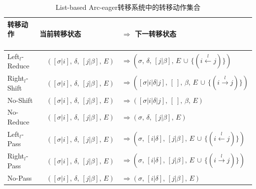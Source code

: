 \begin{table}[htbp]
	\centering
	\small
	\renewcommand{\arraystretch}{1.2}
	\begin{tabular}{l|ll}
		\hline
		\bf 转移动作 \ \ \ \ & \bf 当前转移状态 & $\Rightarrow$ \bf 下一转移状态 \\
		\hline\hline
		Left$_l$-Reduce &\ \ $([\sigma|i],\,\delta,\,[j|\beta],\,E)$ & $\Rightarrow (\sigma,\,\delta,\,[j|\beta],\,E\,\cup\,\{(i\xleftarrow{l}j)\})$ \\
		Right$_l$-Shift &\ \ $([\sigma|i],\,\delta,\,[j|\beta],\,E)$ & $\Rightarrow ([\sigma|i|\delta|j],\,[\ ],\,\beta,\,E\,\cup\,\{(i\xrightarrow{l}j)\})$ \\
		No-Shift &\ \ $([\sigma|i],\,\delta,\,[j|\beta],\,E)$ & $\Rightarrow 
		([\sigma|i|\delta|j],\,[\ ],\,\beta,\,E)$ \\
		No-Reduce &\ \ $([\sigma|i],\,\delta,\,[j|\beta],\,E)$ & $\Rightarrow (\sigma,\,\delta,\,[j|\beta],\,E)$\\
		\hline
		Left$_l$-Pass &\ \ $([\sigma|i],\,\delta,\,[j|\beta],\,E)$ & $\Rightarrow (\sigma,\,[i|\delta],\,[j|\beta],\,E\,\cup\,\{(i\xleftarrow{l}j)\})$\\
		Right$_l$-Pass &\ \ $([\sigma|i],\,\delta,\,[j|\beta],\,E)$ & $\Rightarrow (\sigma,\,[i|\delta],\,[j|\beta],\,E\,\cup\,\{(i\xrightarrow{l}j)\})$\\
		No-Pass &\ \ $([\sigma|i],\,\delta,\,[j|\beta],\,E)$ & $\Rightarrow (\sigma,\,[i|\delta]	,\,[j|\beta],\,E)$\\
		\hline
	\end{tabular}
	\caption{List-based Arc-eager转移系统中的转移动作集合}
	\label{tbl:actions}
\end{table}


